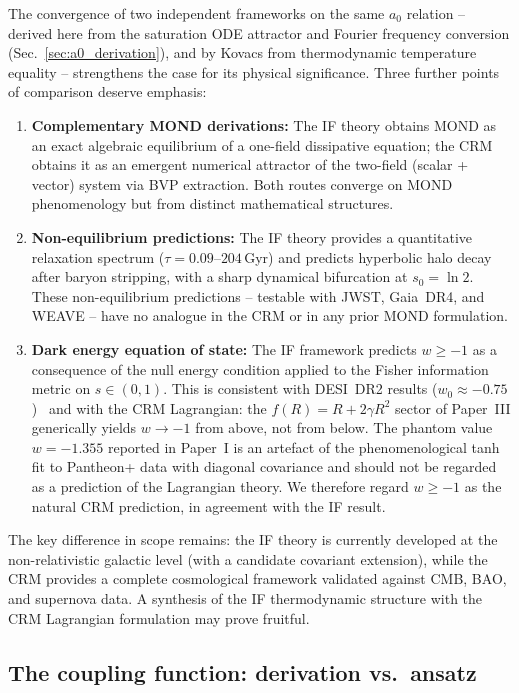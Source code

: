 \documentclass[aps,prd,twocolumn,superscriptaddress,nofootinbib]{revtex4-2}
\begin{document}
The convergence of two independent frameworks on the same $a_0$ relation -- derived here from the saturation ODE attractor and Fourier frequency conversion (Sec.~\ref{sec:a0_derivation}), and by Kovacs from thermodynamic temperature equality -- strengthens the case for its physical significance. Three further points of comparison deserve emphasis:

\begin{enumerate}
\item \textbf{Complementary MOND derivations:} The IF theory obtains MOND as an exact algebraic equilibrium of a one-field dissipative equation; the CRM obtains it as an emergent numerical attractor of the two-field (scalar + vector) system via BVP extraction. Both routes converge on MOND phenomenology but from distinct mathematical structures.

\item \textbf{Non-equilibrium predictions:} The IF theory provides a quantitative relaxation spectrum ($\tau = 0.09$--$204$\,Gyr) and predicts hyperbolic halo decay after baryon stripping, with a sharp dynamical bifurcation at $s_0 = \ln 2$. These non-equilibrium predictions -- testable with JWST, Gaia~DR4, and WEAVE -- have no analogue in the CRM or in any prior MOND formulation.

\item \textbf{Dark energy equation of state:} The IF framework predicts $w \geq -1$ as a consequence of the null energy condition applied to the Fisher information metric on $s \in (0,1)$. This is consistent with DESI~DR2 results ($w_0 \approx -0.75$)~\cite{DESI2025} and with the CRM Lagrangian: the $f(R) = R + 2\gamma R^2$ sector of Paper~III generically yields $w \to -1$ from above, not from below. The phantom value $w = -1.355$ reported in Paper~I is an artefact of the phenomenological tanh fit to Pantheon+ data with diagonal covariance and should not be regarded as a prediction of the Lagrangian theory. We therefore regard $w \geq -1$ as the natural CRM prediction, in agreement with the IF result.
\end{enumerate}

The key difference in scope remains: the IF theory is currently developed at the non-relativistic galactic level (with a candidate covariant extension), while the CRM provides a complete cosmological framework validated against CMB, BAO, and supernova data. A synthesis of the IF thermodynamic structure with the CRM Lagrangian formulation may prove fruitful.

\subsection{The coupling function: derivation vs.\ ansatz}
\end{document}
